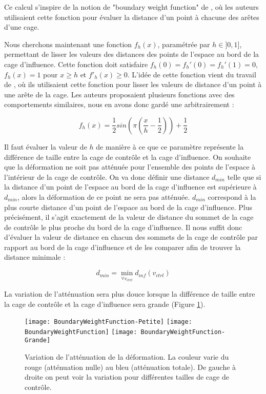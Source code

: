 Ce calcul s'inspire de la notion de "boundary weight function" de
\cite{GPCP13}, où les auteurs utilisaient cette fonction pour évaluer la
distance d'un point à chacune des arêtes d'une cage.

Nous cherchons maintenant une fonction $f_h(x)$, paramétrée par $h \in ]0,
1]$, permettant de lisser les valeurs des distances des points de l'espace au
bord de la cage d'influence. Cette fonction doit satisfaire $f_h(0) = f_h'(0)
= f_h'(1) = 0$, $f_h(x)=1$ pour $x \geq h$ et $f'_h(x) \geq 0$. L'idée de
cette fonction vient du travail de \cite{GPCP13}, où ils utilisaient cette
fonction pour lisser les valeurs de distance d'un point à une arête de la
cage. Les auteurs proposaient plusieurs fonctions avec des comportements
similaires, nous en avons donc gardé une arbitrairement :

\begin{equation}
  f_h(x) = \frac{1}{2} sin(\pi(\frac{x}{h} - \frac{1}{2})) + \frac{1}{2}
\end{equation}

Il faut évaluer la valeur de $h$ de manière à ce que ce paramètre représente
la différence de taille entre la cage de contrôle et la cage d'influence. On
souhaite que la déformation ne soit pas atténuée pour l'ensemble des points de
l'espace à l'intérieur de la cage de contrôle. On va donc définir une distance
$d_{min}$ telle que si la distance d'un point de l'espace au bord de la cage
d'influence est supérieure à $d_{min}$, alors la déformation de ce point ne
sera pas atténuée. $d_{min}$ correspond à la plus courte distance d'un point
de l'espace au bord de la cage d'influence. Plus précisément, il s'agit
exactement de la valeur de distance du sommet de la cage de contrôle le plus
proche du bord de la cage d'influence. Il nous suffit donc d'évaluer la valeur
de distance en chacun des sommets de la cage de contrôle par rapport au bord
de la cage d'influence et de les comparer afin de trouver la distance minimale
:

\begin{equation}
  d_{min} = \min_{\forall v_{ctrl}} d_{inf}(v_{ctrl})
\end{equation}

La variation de l'atténuation sera plus douce lorsque la différence de taille
entre la cage de contrôle et la cage d'influence sera grande (Figure
\ref{MELBou}).

\begin{figure}[ht]
  \begin{center}
    \texttt{[image: BoundaryWeightFunction-Petite]}
    \texttt{[image: BoundaryWeightFunction]}
    \texttt{[image: BoundaryWeightFunction-Grande]}

    \caption[Variation de l'atténuation de la déformation] {Variation de
l'atténuation de la déformation. La couleur varie du rouge (atténuation nulle)
au bleu (atténuation totale). De gauche à droite on peut voir la variation
pour différentes tailles de cage de contrôle.}

    \label{MELBou}
  \end{center}
\end{figure}

